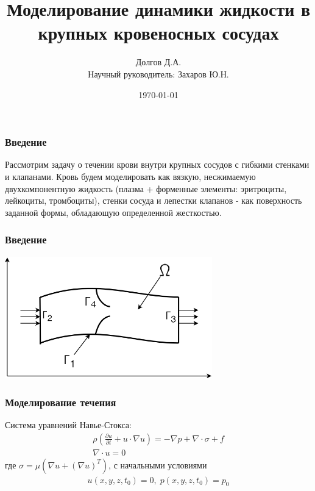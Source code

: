 \documentclass[14pt]{beamer}
\title[Моделирование динамики жидкости в сосудах]{Моделирование динамики жидкости в крупных кровеносных сосудах}
\date{\today}
\author[Долгов Д.А.]{Долгов Д.А.\\{\small Научный руководитель: Захаров Ю.Н.}}
\institute{Кемеровский Государственный Университет \\
    \vspace{0.7cm}
    \vspace{0.7cm}
}
\begin{document}
\maketitle

\begin{frame}
\frametitle{Введение}
Рассмотрим задачу о течении крови внутри крупных сосудов с гибкими стенками и клапанами. Кровь будем моделировать как вязкую, несжимаемую двухкомпонентную жидкость (плазма + форменные элементы: эритроциты, лейкоциты, тромбоциты), стенки сосуда и лепестки клапанов - как поверхность заданной формы, обладающую определенной жесткостью.
\end{frame}

\begin{frame}
\frametitle{Введение}
    \begin{center}
        \includegraphics[width=9cm]{area.png}
    \end{center}
\end{frame}

\begin{frame}
\frametitle{Моделирование течения}
Система уравнений Навье-Стокса:
\begin{gather}
    \label{eq:motion}
    \rho ( \frac{\partial u}{\partial t} + u \cdot \nabla u) = - \nabla p + \nabla \cdot \sigma + f\\
    \label{eq:continuity}
    \nabla \cdot u = 0 
\end{gather}
где $\sigma = \mu (\nabla u + (\nabla u)^{T})$, с начальными условиями
\begin{gather}
    u(x, y, z, t_0) = 0,\;p(x, y, z, t_0) = p_0
\end{gather}

\end{frame}
\end{document}
